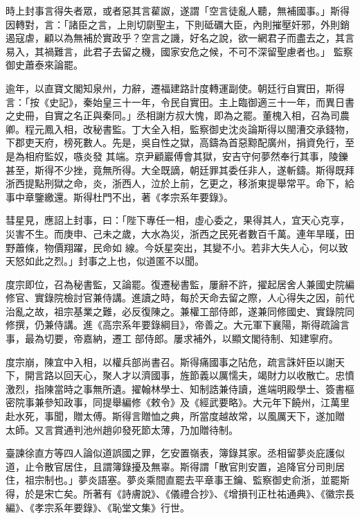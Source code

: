 \begin{pinyinscope}
 時上封事言得失者眾，或者惡其言雚詉，遂謂「空言徒亂人聽，無補國事。」斯得因轉對，言：「諸臣之言，上則切劘聖主，下則砥礪大臣，內則摧壓奸邪，外則銷遏寇虐，顧以為無補於實政乎？空言之譏，好名之說，欲一網君子而盡去之，其言易入，其禍難言，此君子去留之機，國家安危之候，不可不深留聖慮者也。」
 監察御史蕭泰來論罷。



 逾年，以直寶文閣知泉州，力辭，遷福建路計度轉運副使。朝廷行自實田，斯得言：「按《史記》，秦始皇三十一年，令民自實田。主上臨御適三十一年，而異日書之史冊，自實之名正與秦同。」丞相謝方叔大愧，即為之罷。董槐入相，召為司農卿。程元鳳入相，改秘書監。丁大全入相，監察御史沈炎論斯得以閩漕交承錢物，下郡吏天府，榜死數人。先是，吳自性之獄，高鑄為首惡黥配廣州，捐資免行，至是為相府監奴，嗾炎發
 其端。京尹顧巖傅會其獄，安吉守何夢然奉行其事，陵鑠甚至，斯得不少挫，竟無所得。大全既謫，朝廷罪其委任非人，遂斬鑄。斯得既拜浙西提點刑獄之命，炎，浙西人，泣於上前，乞更之，移浙東提舉常平。命下，給事中章鑒繳還。斯得杜門不出，著《孝宗系年要錄》。



 彗星見，應詔上封事，曰：「陛下專任一相，虛心委之，果得其人，宜天心克享，災害不生。而庚申、己未之歲，大水為災，浙西之民死者數百千萬。連年旱暵，田野蕭條，物價翔躍，民命如
 線。今妖星突出，其變不小。若非大失人心，何以致天怒如此之烈。」封事之上也，似道匿不以聞。



 度宗即位，召為秘書監，又論罷。復遷秘書監，屢辭不許，擢起居舍人兼國史院編修官、實錄院檢討官兼侍講。進讀之時，每於天命去留之際，人心得失之因，前代治亂之故，祖宗基業之難，必反復陳之。兼權工部侍郎，遂兼同修國史、實錄院同修撰，仍兼侍講。進《高宗系年要錄綱目》，帝善之。大元軍下襄陽，斯得疏論言事，最為切要，帝嘉納，遷工
 部侍郎。屢求補外，以顯文閣待制、知建寧府。



 度宗崩，陳宜中入相，以權兵部尚書召。斯得痛國事之阽危，疏言誅奸臣以謝天下，開言路以回天心，聚人才以濟國事，旌節義以厲懦夫，竭財力以收散亡。忠憤激烈，指陳當時之事無所遺。擢翰林學士、知制誥兼侍讀，進端明殿學士、簽書樞密院事兼參知政事，同提舉編修《敕令》及《經武要略》。大元年下饒州，江萬里赴水死，事聞，贈太傅。斯得言贈恤之典，所當度越故常，以風厲天下，遂加贈
 太師。又言賞通判池州趙卯發死節太薄，乃加贈待制。



 臺諫徐直方等四人論似道誤國之罪，乞安置嶺表，簿錄其家。丞相留夢炎庇護似道，止令散官居住，且謂簿錄擾及無辜。斯得謂「散官則安置，追降官分司則居住，祖宗制也。」夢炎語塞。夢炎乘間直罷去平章事王鑰、監察御史俞浙，並罷斯得，於是宋亡矣。所著有《詩膚說》、《儀禮合抄》、《增損刊正杜祐通典》、《徽宗長編》、《孝宗系年要錄》、《恥堂文集》行世。




\end{pinyinscope}
